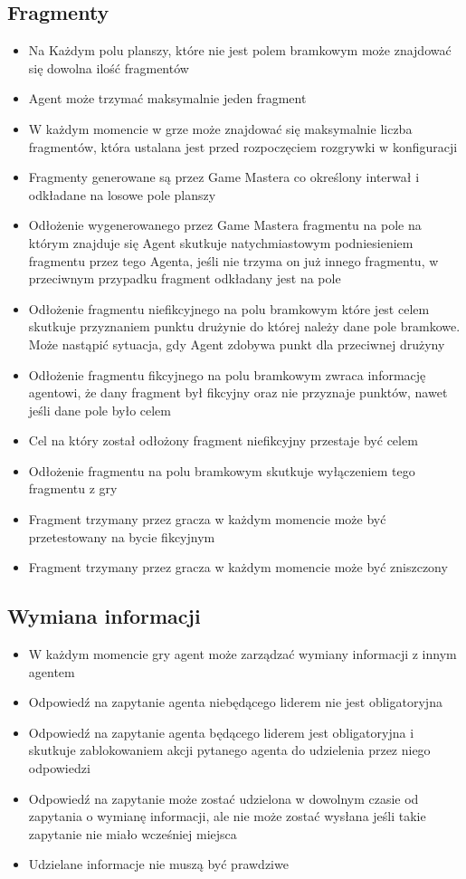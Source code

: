 \documentclass[Dokumentacja.tex]{subfiles}
\begin{document}
\subsection{Fragmenty}
\begin{itemize}
    \item Na Każdym polu planszy, które nie jest polem bramkowym może znajdować się dowolna ilość fragmentów
    \item Agent może trzymać maksymalnie jeden fragment
    \item W każdym momencie w grze może znajdować się maksymalnie liczba fragmentów, która ustalana jest przed rozpoczęciem rozgrywki w konfiguracji
    \item Fragmenty generowane są przez Game Mastera co określony interwał i odkładane na losowe pole planszy
    \item Odłożenie wygenerowanego przez Game Mastera fragmentu na pole na którym znajduje się Agent skutkuje natychmiastowym podniesieniem fragmentu przez tego Agenta, jeśli nie trzyma on już innego fragmentu, w przeciwnym przypadku fragment odkładany jest na pole
    \item Odłożenie fragmentu niefikcyjnego na polu bramkowym które jest celem skutkuje przyznaniem punktu drużynie do której należy dane pole bramkowe. Może nastąpić sytuacja, gdy Agent zdobywa punkt dla przeciwnej drużyny
    \item Odłożenie fragmentu fikcyjnego na polu bramkowym zwraca informację agentowi, że dany fragment był fikcyjny oraz nie przyznaje punktów, nawet jeśli dane pole było celem
    \item Cel na który został odłożony fragment niefikcyjny przestaje być celem
    \item Odłożenie fragmentu na polu bramkowym skutkuje wyłączeniem tego fragmentu z gry
    \item Fragment trzymany przez gracza w każdym momencie może być przetestowany na bycie fikcyjnym
    \item Fragment trzymany przez gracza w każdym momencie może być zniszczony
\end{itemize}
\subsection{Wymiana informacji}
\begin{itemize}
    \item W każdym momencie gry agent może zarządzać wymiany informacji z innym agentem
    \item Odpowiedź na zapytanie agenta niebędącego liderem nie jest obligatoryjna
    \item Odpowiedź na zapytanie agenta będącego liderem jest obligatoryjna i skutkuje zablokowaniem akcji pytanego agenta do udzielenia przez niego odpowiedzi
    \item Odpowiedź na zapytanie może zostać udzielona w dowolnym czasie od zapytania o wymianę informacji, ale nie może zostać wysłana jeśli takie zapytanie nie miało wcześniej miejsca
    \item Udzielane informacje nie muszą być prawdziwe
\end{itemize}
\end{document}

